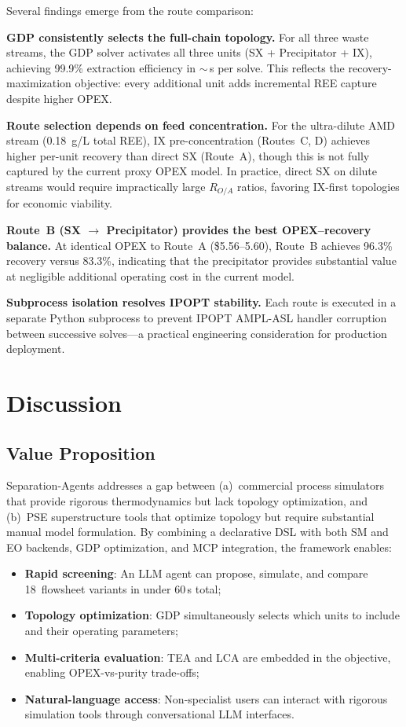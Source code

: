 \documentclass[11pt]{article}
\begin{document}
Several findings emerge from the route comparison:

\textbf{GDP consistently selects the full-chain topology.}
For all three waste streams, the GDP solver activates all three units
(SX + Precipitator + IX), achieving 99.9\% extraction efficiency
in $\sim$\,s per solve.  This reflects the recovery-maximization
objective: every additional unit adds incremental REE capture despite
higher OPEX.

\textbf{Route selection depends on feed concentration.}
For the ultra-dilute AMD stream (0.18~g/L total REE), IX
pre-concentration (Routes~C, D) achieves higher per-unit recovery
than direct SX (Route~A), though this is not fully captured by the
current proxy OPEX model.  In practice, direct SX on dilute streams
would require impractically large $R_{O/A}$ ratios, favoring
IX-first topologies for economic viability.

\textbf{Route~B (SX $\rightarrow$ Precipitator) provides the best
OPEX--recovery balance.}  At identical OPEX to Route~A (\$5.56--5.60),
Route~B achieves 96.3\% recovery versus 83.3\%, indicating that
the precipitator provides substantial value at negligible additional
operating cost in the current model.

\textbf{Subprocess isolation resolves IPOPT stability.}
Each route is executed in a separate Python subprocess to prevent
IPOPT AMPL-ASL handler corruption between successive solves---a
practical engineering consideration for production deployment.


\section{Discussion}\label{sec:discussion}

\subsection{Value Proposition}

Separation-Agents addresses a gap between (a)~commercial process
simulators that provide rigorous thermodynamics but lack topology
optimization, and (b)~PSE superstructure tools that optimize topology
but require substantial manual model formulation.  By combining a
declarative DSL with both SM and EO backends, GDP optimization, and MCP
integration, the framework enables:
\begin{itemize}
  \item \textbf{Rapid screening}: An LLM agent can propose, simulate,
    and compare 18~flowsheet variants in under 60\,s total;
  \item \textbf{Topology optimization}: GDP simultaneously selects
    which units to include and their operating parameters;
  \item \textbf{Multi-criteria evaluation}: TEA and LCA are embedded
    in the objective, enabling OPEX-vs-purity trade-offs;
  \item \textbf{Natural-language access}: Non-specialist users can
    interact with rigorous simulation tools through conversational
    LLM interfaces.
\end{itemize}
\end{document}
